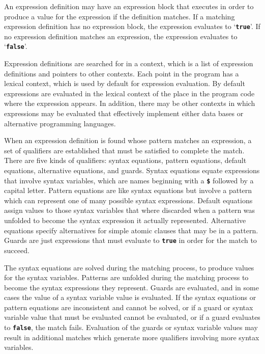 \documentclass[12pt]{article}
\newcommand{\TT}[1]{{\tt \bfseries #1}}
\newcommand{\ttkey}[1]{{\tt \bfseries #1}}
\begin{document}
An expression definition may have an expression block that executes
in order to produce a value for the expression if the definition
matches.  If a matching
expression definition has no expression block, the expression
evaluates to `\ttkey{true}'.  If no expression definition matches an
expression, the expression evaluates to `\ttkey{false}'.

Expression definitions are searched for in a context, which is a list
of expression definitions and pointers to other contexts.
Each point in the program has a lexical context, which is used by default
for expression evaluation. 
By default expressions are evaluated in the
lexical context of the place in the program code where the expression
appears.  In addition, there may be other
contexts in which expressions may be evaluated that effectively implement
either data bases or alternative programming languages.

When an expression definition is found whose pattern matches an expression,
a set of qualifiers are established that must be satisfied to
complete the match.  There are five kinds of qualifiers: syntax
equations, pattern equations, default equations, alternative
equations, and guards.
Syntax equations equate expressions that involve syntax variables,
which are names beginning with a \TT{\$} followed by a capital letter.
Pattern equations are like syntax equations but
involve a pattern which can represent one of many possible syntax
expressions.  Default equations assign values to those
syntax variables that where
discarded when a pattern was unfolded to become the syntax expression
it actually represented.  Alternative equations specify alternatives
for simple atomic clauses that may be in a pattern.
Guards are just expressions that must evaluate to
\TT{true} in order for the match to succeed.

The syntax equations are solved during the matching process,
to produce values for the syntax variables.  Patterns are unfolded during
the matching process to become the syntax expressions they represent.
Guards are evaluated, and in some cases the value of a syntax variable
value is evaluated.
If the syntax equations or pattern equations are inconsistent and
cannot be solved, or if a guard or syntax variable value that must be
evaluated cannot be evaluated, or if a guard evaluates to \TT{false},
the match fails.  Evaluation of the guards or syntax variable values
may result in additional matches which generate more
qualifiers involving more syntax variables.
\end{document}
